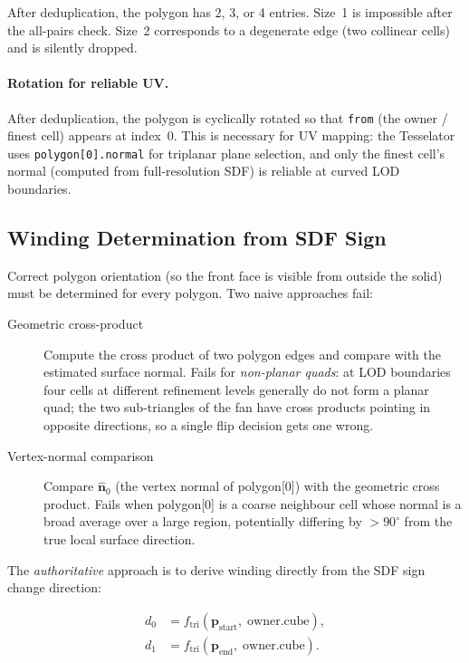 \documentclass[10pt,a4paper]{article}
\begin{document}
After deduplication, the polygon has 2, 3, or 4 entries.  Size~1 is
impossible after the all-pairs check.  Size~2 corresponds to a degenerate
edge (two collinear cells) and is silently dropped.

\paragraph{Rotation for reliable UV.}
After deduplication, the polygon is cyclically rotated so that
\lstinline{from} (the owner / finest cell) appears at index~0.  This is
necessary for UV mapping: the Tesselator uses
\lstinline{polygon[0].normal} for triplanar plane selection, and only
the finest cell's normal (computed from full-resolution SDF) is reliable
at curved LOD boundaries.

\subsection{Winding Determination from SDF Sign}
\label{sec:itriangles:winding}

Correct polygon orientation (so the front face is visible from outside
the solid) must be determined for every polygon.  Two naive approaches
fail:
\begin{description}
  \item[Geometric cross-product] Compute the cross product of two polygon
    edges and compare with the estimated surface normal.  Fails for
    \emph{non-planar quads}: at LOD boundaries four cells at different
    refinement levels generally do not form a planar quad; the two
    sub-triangles of the fan have cross products pointing in opposite
    directions, so a single flip decision gets one wrong.
  \item[Vertex-normal comparison] Compare $\hat{\mathbf{n}}_0$
    (the vertex normal of polygon[0]) with the geometric cross product.
    Fails when polygon[0] is a coarse neighbour cell whose normal is a
    broad average over a large region, potentially differing by $>90^\circ$
    from the true local surface direction.
\end{description}

The \emph{authoritative} approach is to derive winding directly from the
SDF sign change direction:

\begin{align*}
  d_0 &= f_{\text{tri}}(\mathbf{p}_{\text{start}},\;
          \text{owner.cube}), \\
  d_1 &= f_{\text{tri}}(\mathbf{p}_{\text{end}},\;
          \text{owner.cube}).
\end{align*}
\end{document}
